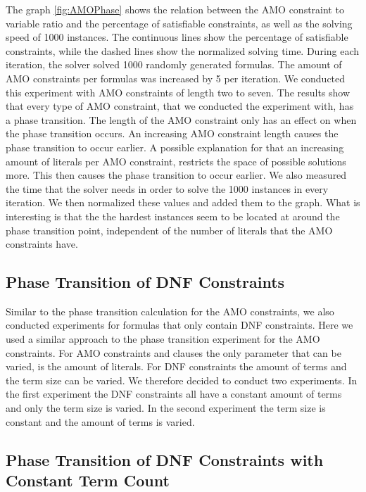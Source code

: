 The graph \ref{fig:AMOPhase} shows the relation between the AMO constraint to variable ratio and the percentage of satisfiable constraints, as well as the solving speed of 1000 instances. The continuous lines show the percentage of satisfiable constraints, while the dashed lines show the normalized solving time. During each iteration, the solver solved 1000 randomly generated formulas. The amount of AMO constraints per formulas was increased by 5 per iteration. We conducted this experiment with AMO constraints of length two to seven. The results show that every type of AMO constraint, that we conducted the experiment with, has a phase transition. The length of the AMO constraint only has an effect on when the phase transition occurs. An increasing AMO constraint length causes the phase transition to occur earlier. A possible explanation for that an increasing amount of literals per AMO constraint, restricts the space of possible solutions more. This then causes the phase transition to occur earlier. We also measured the time that the solver needs in order to solve the 1000 instances in every iteration. We then normalized these values and added them to the graph. What is interesting is that the the hardest instances seem to be located at around the phase transition point, independent of the number of literals that the AMO constraints have.

\subsection{Phase Transition of DNF Constraints}

Similar to the phase transition calculation for the AMO constraints, we also conducted experiments for formulas that only contain DNF constraints. Here we used a similar approach to the phase transition experiment for the AMO constraints. For AMO constraints and clauses the only parameter that can be varied, is the amount of literals. For DNF constraints the amount of terms and the term size can be varied. We therefore decided to conduct two experiments. In the first experiment the DNF constraints all have a constant amount of terms and only the term size is varied. In the second experiment the term size is constant and the amount of terms is varied.

\subsection{Phase Transition of DNF Constraints with Constant Term Count}

